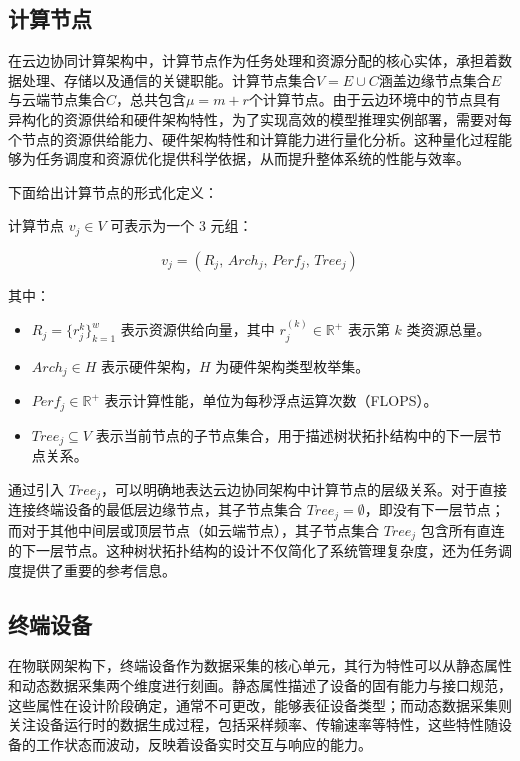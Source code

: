 \subsection{计算节点}

在云边协同计算架构中，计算节点作为任务处理和资源分配的核心实体，承担着数据处理、存储以及通信的关键职能。计算节点集合$V = E \cup C$涵盖边缘节点集合$E$与云端节点集合$C$，总共包含$\mu=m+r$个计算节点。由于云边环境中的节点具有异构化的资源供给和硬件架构特性，为了实现高效的模型推理实例部署，需要对每个节点的资源供给能力、硬件架构特性和计算能力进行量化分析。这种量化过程能够为任务调度和资源优化提供科学依据，从而提升整体系统的性能与效率。

下面给出计算节点的形式化定义：

\begin{definition}[计算节点]
\label{def:node}
计算节点 $v_j \in V$ 可表示为一个 3 元组：
\end{definition}

$$
v_j = (R_j,\, Arch_j,\, Perf_j ,\, Tree_j)
$$

其中：
\begin{itemize}
    \item $R_j = \{r^{k}_j\}_{k=1}^w$ 表示资源供给向量，其中 $r^{(k)}_j \in \mathbb{R}^+$ 表示第 $k$ 类资源总量。
    \item $Arch_j \in H$ 表示硬件架构，$H$ 为硬件架构类型枚举集。
    \item $Perf_j \in \mathbb{R}^+$ 表示计算性能，单位为每秒浮点运算次数（FLOPS）。
    \item $Tree_j \subseteq V$ 表示当前节点的子节点集合，用于描述树状拓扑结构中的下一层节点关系。
\end{itemize}

通过引入 $Tree_j$，可以明确地表达云边协同架构中计算节点的层级关系。对于直接连接终端设备的最低层边缘节点，其子节点集合 $Tree_j = \emptyset$，即没有下一层节点；而对于其他中间层或顶层节点（如云端节点），其子节点集合 $Tree_j$ 包含所有直连的下一层节点。这种树状拓扑结构的设计不仅简化了系统管理复杂度，还为任务调度提供了重要的参考信息。

\subsection{终端设备}

在物联网架构下，终端设备作为数据采集的核心单元，其行为特性可以从静态属性和动态数据采集两个维度进行刻画。静态属性描述了设备的固有能力与接口规范，这些属性在设计阶段确定，通常不可更改，能够表征设备类型；而动态数据采集则关注设备运行时的数据生成过程，包括采样频率、传输速率等特性，这些特性随设备的工作状态而波动，反映着设备实时交互与响应的能力。


